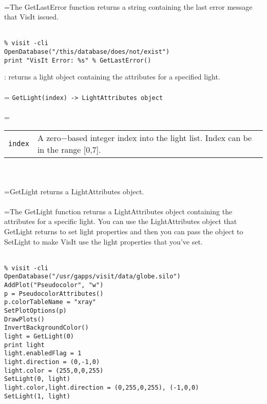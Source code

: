 \documentclass[10pt,a4paper]{report}
\begin{document}
 \\ 
\hangindent=\parindent The GetLastError function returns a string containing the last error message that VisIt issued. \\[-3mm] 

\\[-6mm]
\begin{verbatim}% visit -cli
OpenDatabase("/this/database/does/not/exist")
print "VisIt Error: %s" % GetLastError()
\end{verbatim}
\newpage


{}
: returns a light object containing the attributes for a specified light.\\[-3mm]

 \\ 
\hangindent=\parindent 
\verb!GetLight(index) -> LightAttributes object!\\ [-3mm]

 \\ 
\hangindent=\parindent 
\begin{tabular}{lp{9cm}}
\verb!index! & A zero$-$based integer index into the light list. Index can be in the range [0,7]. \\
\end{tabular} \\[-2mm]


 \\ 
\hangindent=\parindent GetLight returns a LightAttributes object. \\[-3mm] 

 \\ 
\hangindent=\parindent The GetLight function returns a LightAttributes object containing the attributes for a specific light. You can use the LightAttributes object that GetLight returns to set light properties and then you can pass the object to SetLight to make VisIt use the light properties that you've set. \\[-3mm] 

\\[-6mm]
\begin{verbatim}% visit -cli
OpenDatabase("/usr/gapps/visit/data/globe.silo")
AddPlot("Pseudocolor", "w")
p = PseudocolorAttributes()
p.colorTableName = "xray"
SetPlotOptions(p)
DrawPlots()
InvertBackgroundColor()
light = GetLight(0)
print light
light.enabledFlag = 1
light.direction = (0,-1,0)
light.color = (255,0,0,255)
SetLight(0, light)
light.color,light.direction = (0,255,0,255), (-1,0,0)
SetLight(1, light)
\end{verbatim}
\newpage
\end{document}
